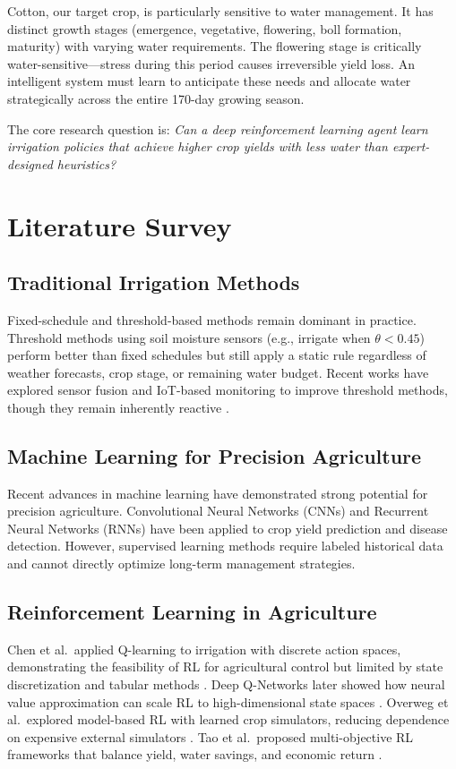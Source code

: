 \documentclass[12pt, a4paper]{article}
\begin{document}
Cotton, our target crop, is particularly sensitive to water management. It has distinct growth stages (emergence, vegetative, flowering, boll formation, maturity) with varying water requirements. The flowering stage is critically water-sensitive---stress during this period causes irreversible yield loss. An intelligent system must learn to anticipate these needs and allocate water strategically across the entire 170-day growing season.

The core research question is: \textit{Can a deep reinforcement learning agent learn irrigation policies that achieve higher crop yields with less water than expert-designed heuristics?}

\section{Literature Survey}

\subsection{Traditional Irrigation Methods}
Fixed-schedule and threshold-based methods remain dominant in practice. Threshold methods using soil moisture sensors (e.g., irrigate when $\theta < 0.45$) perform better than fixed schedules but still apply a static rule regardless of weather forecasts, crop stage, or remaining water budget. Recent works have explored sensor fusion and IoT-based monitoring to improve threshold methods, though they remain inherently reactive \cite{zhang2021iot}.

\subsection{Machine Learning for Precision Agriculture}
Recent advances in machine learning have demonstrated strong potential for precision agriculture. Convolutional Neural Networks (CNNs) and Recurrent Neural Networks (RNNs) have been applied to crop yield prediction \cite{nevavuori2020crop} and disease detection. However, supervised learning methods require labeled historical data and cannot directly optimize long-term management strategies.

\subsection{Reinforcement Learning in Agriculture}
Chen et al.\ applied Q-learning to irrigation with discrete action spaces, demonstrating the feasibility of RL for agricultural control but limited by state discretization and tabular methods \cite{chen2021rl}. Deep Q-Networks later showed how neural value approximation can scale RL to high-dimensional state spaces \cite{mnih2015dqn}. Overweg et al.\ explored model-based RL with learned crop simulators, reducing dependence on expensive external simulators \cite{overweg2021crop}. Tao et al.\ proposed multi-objective RL frameworks that balance yield, water savings, and economic return \cite{tao2022multi}.
\end{document}

